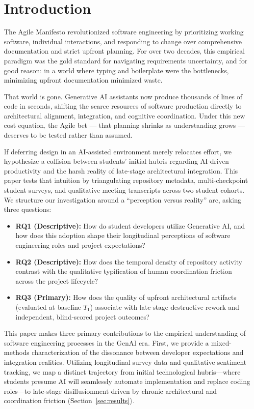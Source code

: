\documentclass[conference]{IEEEtran}
\begin{document}
\section{Introduction}

The Agile Manifesto revolutionized software engineering by prioritizing
working software, individual interactions, and responding to change
over comprehensive documentation and strict upfront planning. For over
two decades, this empirical paradigm was the gold standard for
navigating requirements uncertainty, and for good reason: in a world
where typing and boilerplate were the bottlenecks, minimizing upfront
documentation minimized waste.

That world is gone. Generative AI assistants now produce thousands of
lines of code in seconds, shifting the scarce resources of software
production directly to architectural alignment, integration, and
cognitive coordination. Under this new cost equation, the Agile bet ---
that planning shrinks as understanding grows --- deserves to be tested
rather than assumed. 

If deferring design in an AI-assisted environment merely relocates effort, 
we hypothesize a collision between students' initial hubris regarding AI-driven 
productivity and the harsh reality of late-stage architectural integration. 
This paper tests that intuition by triangulating repository metadata, 
multi-checkpoint student surveys, and qualitative meeting transcripts across 
two student cohorts. We structure our investigation around a ``perception versus 
reality'' arc, asking three questions:

\begin{itemize}
    \item \textbf{RQ1 (Descriptive):} How do student developers utilize Generative AI, and how does this adoption shape their longitudinal perceptions of software engineering roles and project expectations?
    \item \textbf{RQ2 (Descriptive):} How does the temporal density of repository activity contrast with the qualitative typification of human coordination friction across the project lifecycle?
    \item \textbf{RQ3 (Primary):} How does the quality of upfront architectural artifacts (evaluated at baseline $T_1$) associate with late-stage destructive rework and independent, blind-scored project outcomes?
\end{itemize}

This paper makes three primary contributions to the empirical understanding of software engineering processes in the GenAI era. First, we provide a mixed-methods characterization of the dissonance between developer expectations and integration realities. Utilizing longitudinal survey data and qualitative sentiment tracking, we map a distinct trajectory from initial technological hubris---where students presume AI will seamlessly automate implementation and replace coding roles---to late-stage disillusionment driven by chronic architectural and coordination friction (Section~\ref{sec:results}). 
\end{document}
